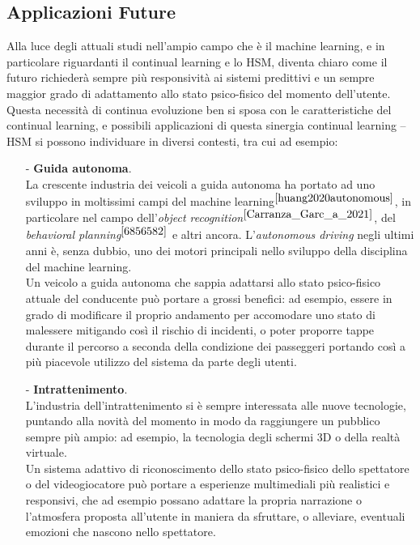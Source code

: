 \subsection{Applicazioni Future}
Alla luce degli attuali studi nell'ampio campo che è il machine learning, e in particolare riguardanti il continual learning e lo HSM, diventa chiaro come il futuro richiederà sempre più responsività ai sistemi predittivi e un sempre maggior grado di adattamento allo stato psico-fisico del momento dell'utente. Questa necessità di continua evoluzione ben si sposa con le caratteristiche del continual learning, e possibili applicazioni di questa sinergia continual learning -- HSM si possono individuare in diversi contesti, tra cui ad esempio:
\begin{itemize}
    \item[-] \textbf{Guida autonoma}.\\La crescente industria dei veicoli a guida autonoma ha portato ad uno sviluppo in moltissimi campi del machine learning$^{\cite{huang2020autonomous}}$, in particolare nel campo dell'\textit{object recognition}$^{\cite{Carranza_Garc_a_2021}}$, del \textit{behavioral planning}$^{\cite{6856582}}$ e altri ancora. L'\textit{autonomous driving} negli ultimi anni è, senza dubbio, uno dei motori principali nello sviluppo della disciplina del machine learning.\\
    Un veicolo a guida autonoma che sappia adattarsi allo stato psico-fisico attuale del conducente può portare a grossi benefici: ad esempio, essere in grado di modificare il proprio andamento per accomodare uno stato di malessere mitigando così il rischio di incidenti, o poter proporre tappe durante il percorso a seconda della condizione dei passeggeri portando così a più piacevole utilizzo del sistema da parte degli utenti.
    \item[-] \textbf{Intrattenimento}.\\L'industria dell'intrattenimento si è sempre interessata alle nuove tecnologie, puntando alla novità del momento in modo da raggiungere un pubblico sempre più ampio: ad esempio, la tecnologia degli schermi 3D o della realtà virtuale.\\
    Un sistema adattivo di riconoscimento dello stato psico-fisico dello spettatore o del videogiocatore può portare a esperienze multimediali più realistici e responsivi, che ad esempio possano adattare la propria narrazione o l'atmosfera proposta all'utente in maniera da sfruttare, o alleviare, eventuali emozioni che nascono nello spettatore.
\end{itemize}

